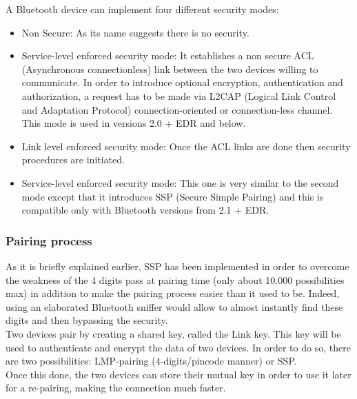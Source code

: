 \noindent A Bluetooth device can implement four different security modes:

  \begin{itemize}[noitemsep,nolistsep]
  	\item Non Secure: As its name suggests there is no security.
  	\item Service-level enforced security mode: It establishes a non secure ACL (Asynchronous connectionless) link between the two devices willing to communicate. In order to introduce optional encryption, authentication and authorization, a request has to be made via L2CAP (Logical Link Control and Adaptation Protocol) connection-oriented or connection-less channel. This mode is used in versions 2.0 + EDR and below.
  	\item Link level enforced security mode: Once the ACL links are done then security procedures are initiated.
  	\item Service-level enforced security mode: This one is very similar to the second mode except that it introduces SSP (Secure Simple Pairing) and this is compatible only with Bluetooth versions from 2.1 + EDR.\\
  \end{itemize}

\subsubsection{Pairing process}

As it is briefly explained earlier, SSP has been implemented in order to overcome the weakness of the 4 digits pass at pairing time (only about 10.000 possibilities max) in addition to make the pairing process easier than it used to be. Indeed, using an elaborated Bluetooth sniffer would allow to almost instantly find these digits and then bypassing the security.\\
	
Two devices pair by creating a shared key, called the Link key. This key will be used to authenticate and encrypt the data of two devices.
In order to do so, there are two possibilities: LMP-pairing (4-digits/pincode manner) or SSP. \\
Once this done, the two devices can store their mutual key in order to use it later for a re-pairing, making the connection much faster.\\

